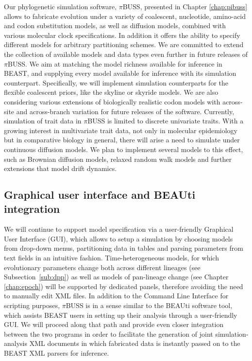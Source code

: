 Our phylogenetic simulation software, $\pi$BUSS, presented in Chapter \ref{chap:pibuss} allows to fabricate evolution under a variety of coalescent, nucleotide, amino-acid and codon substitution models, as well as diffusion models, combined with various molecular clock specifications.
In addition it offers the ability to specify different models for arbitrary partitioning schemes.
We are committed to extend the collection of available models and data types even further in future releases of $\pi$BUSS.
We aim at matching the model richness available for inference in BEAST, and supplying every model available for inference with its simulation counterpart.
Specifically, we will implement simulation counterparts for the flexible coalescent priors, like the skyline \citep{Drummond2005} or skyride \citep{Minin2008b} models.
We are also considering various extensions of biologically realistic codon models with across-site and across-branch variation for future releases of the software.
Currently, simulation of trait data in $\pi$BUSS is limited to discrete univariate traits.
With a growing interest in multivariate trait data, not only in molecular epidemiology but in comparative biology in general, there will arise a need to simulate under continuous diffusion models.
We plan to implement several models to this effect, such as Brownian diffusion models, relaxed random walk models and further extensions that model drift dynamics.

\subsection{Graphical user interface and BEAUti integration}

We will continue to support model specification via a 
user-friendly Graphical User Interface (GUI), which allows to setup a simulation by choosing models from drop-down menus, partitioning data in tables and parsing parameters from text fields in an intuitive fashion.
Time-heterogeneous models, for which evolutionary parameters change both across different lineages (see Subsection~\ref{sub:dpp}) as well as models of pan-lineage change (see Chapter \ref{chap:epoch}) will be supported by dedicated panels, therefore avoiding the need to manually edit XML files.
In addition to the Command Line Interface for scripting purposes, $\pi$BUSS is in a sense similar to the BEAUti software tool, which assists BEAST users in setting up their analysis through a user-friendly GUI.
We will proceed along that path and provide even closer integration between the two programs in order to facilitate the generation of joint simulation-analysis XML documents in which fabricated data is instantly passed on to the BEAST XML parsers for inference.

